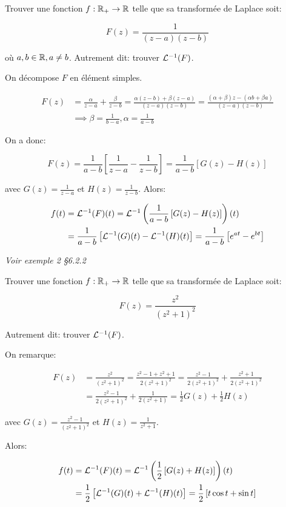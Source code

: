 \begin{example}[1]
    Trouver une fonction $f: \mathbb{R}_+ \rightarrow \mathbb{R}$ telle que sa transformée de Laplace soit:
    
    \[ F(z) = \frac{1}{(z-a)(z-b)} \]
    
    où $a, b \in \mathbb{R}, a \neq b$.
    Autrement dit: trouver $\mathcal{L}^{-1}(F)$.
    
    On décompose $F$ en élément simples.
    
    \begin{align*}
        F(z) &= \frac{\alpha}{z - a} + \frac{\beta}{z - b}
        = \frac{\alpha (z - b) + \beta (z-a)}{(z-a)(z-b)}
        = \frac{(\alpha + \beta) z - (\alpha b + \beta a)}{(z-a)(z-b)}
        \\&\implies \beta = \frac{1}{b - a}, \alpha = \frac{1}{a - b}
    \end{align*}
    
    On a donc:
    
    \[ F(z) = \frac{1}{a - b} \left[\frac{1}{z - a} - \frac{1}{z - b}\right] = \frac{1}{a - b} \left[G(z) - H(z)\right] \]
    
    avec $G(z) = \frac{1}{z - a}$ et $H(z) = \frac{1}{z - b}$.
    Alors:
    
    \begin{align*}
        f(t) &= \mathcal{L}^{-1}(F)(t)
        = \mathcal{L}^{-1}\left(\frac{1}{a - b} \left[G(z) - H(z)\right]\right)(t)
        \\&= \frac{1}{a - b} \left[ \mathcal{L}^{-1}(G)(t) - \mathcal{L}^{-1}(H)(t) \right]
        = \frac{1}{a - b} \left[ e^{at} - e^{bt} \right]
    \end{align*}
    
    \textit{Voir exemple 2 §6.2.2}
\end{example}


\begin{example}[2]
    Trouver une fonction $f: \mathbb{R}_+ \rightarrow \mathbb{R}$ telle que sa transformée de Laplace soit:
    
    \[ F(z) = \frac{z^2}{(z^2+1)^2} \]
    
    Autrement dit: trouver $\mathcal{L}^{-1}(F)$.
    
    On remarque:
    
    \begin{align*}
    F(z) &= \frac{z^2}{(z^2+1)^2}
    = \frac{z^2 - 1 + z^2 + 1}{2(z^2+1)^2}
    = \frac{z^2 - 1}{2(z^2+1)^2} + \frac{z^2 + 1}{2(z^2+1)^2}
    \\&= \frac{z^2 - 1}{2(z^2+1)^2} + \frac{1}{2(z^2+1)}
    = \frac{1}{2} G(z) + \frac{1}{2} H(z)
    \end{align*}
    
    avec $G(z) = \frac{z^2 - 1}{(z^2+1)^2}$ et $H(z) = \frac{1}{z^2+1}$.
    
    Alors:
    
    \begin{align*}
    f(t) &= \mathcal{L}^{-1}(F)(t)
    = \mathcal{L}^{-1}\left(\frac{1}{2} \left[G(z) + H(z)\right]\right)(t)
    \\&= \frac{1}{2} \left[ \mathcal{L}^{-1}(G)(t) + \mathcal{L}^{-1}(H)(t) \right]
    = \frac{1}{2} \left[ t \cos t +  \sin t \right]
    \end{align*}
\end{example}

